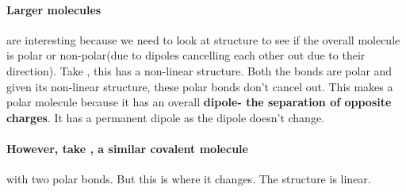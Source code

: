 \paragraph{Larger molecules} are interesting because we need to look at structure to see if the overall molecule is polar or non-polar(due to dipoles cancelling each other out due to their direction).
	Take , this has a non-linear structure. Both the  bonds are polar and given its non-linear structure, these polar bonds don't cancel out.
	This makes  a polar molecule because it has an overall \textbf{dipole- the separation of opposite charges}. It has a permanent dipole as the dipole doesn't change.
	\paragraph{However, take , a similar covalent molecule} with two  polar bonds.
	But this is where it changes. The structure is linear.

